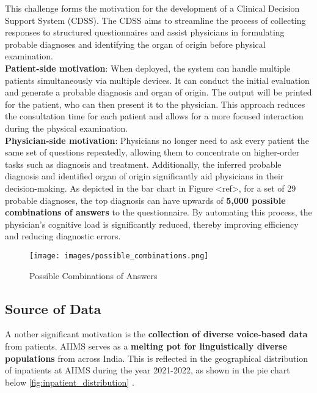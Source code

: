 \noindent This challenge forms the motivation for the development of a Clinical Decision Support System (CDSS). The CDSS aims to streamline the process of collecting responses to structured questionnaires and assist physicians in formulating probable diagnoses and identifying the organ of origin before physical examination.\\[\baselineskip]

\noindent \textcolor{TUMRed}{\textbf{Patient-side motivation}}: When deployed, the system can handle multiple patients simultaneously via multiple devices. It can conduct the initial evaluation and generate a probable diagnosis and organ of origin. The output will be printed for the patient, who can then present it to the physician. This approach reduces the consultation time for each patient and allows for a more focused interaction during the physical examination.\\[\baselineskip]

\noindent \textcolor{TUMRed}{\textbf{Physician-side motivation}}: Physicians no longer need to ask every patient the same set of questions repeatedly, allowing them to concentrate on higher-order tasks such as diagnosis and treatment. Additionally, the inferred probable diagnosis and identified organ of origin significantly aid physicians in their decision-making. As depicted in the bar chart in Figure <ref>, for a set of 29 probable diagnoses, the top diagnosis can have upwards of \textcolor{TUMRed}{\textbf{5,000 possible combinations of answers}} to the questionnaire. By automating this process, the physician's cognitive load is significantly reduced, thereby improving efficiency and reducing diagnostic errors.

\begin{figure}[h]
    \centering
    \texttt{[image: images/possible\_combinations.png]}
    \caption{Possible Combinations of Answers}
    \label{fig:possible_combinations}
\end{figure}

\subsection{Source of Data}
\lettrine{A}{ }nother significant motivation is the \textcolor{TUMRed}{\textbf{collection of diverse voice-based data}} from patients. AIIMS serves as a \textcolor{TUMRed}{\textbf{melting pot for linguistically diverse populations}} from across India. This is reflected in the geographical distribution of inpatients at AIIMS during the year 2021-2022, as shown in the pie chart below \ref{fig:inpatient_distribution} \cite{AIIMS2024}.\\[\baselineskip]


